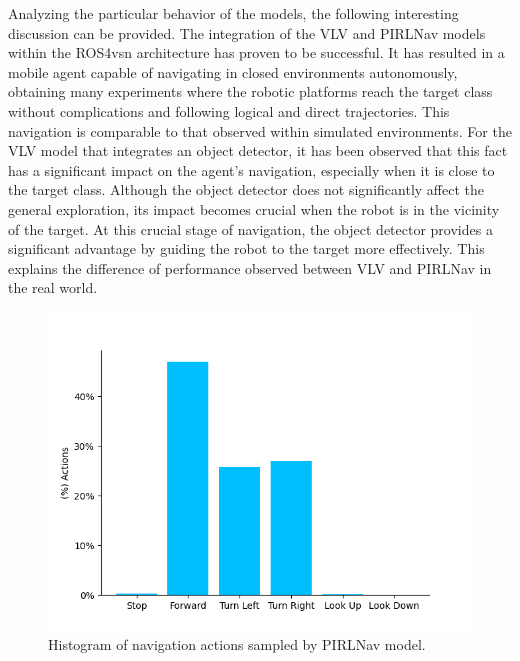 Analyzing the particular behavior of the models, the following interesting discussion can be provided.
The integration of the VLV and PIRLNav models within the ROS4\acrshort{vsn} architecture has proven to be successful.
It has resulted in a mobile agent capable of navigating in closed environments autonomously, obtaining many experiments where the robotic platforms reach the target class without complications and following logical and direct trajectories.
This navigation is comparable to that observed within simulated environments.
For the VLV model that integrates an object detector, it has been observed that this fact has a significant impact on the agent's navigation, especially when it is close to the target class.
Although the object detector does not significantly affect the general exploration, its impact becomes crucial when the robot is in the vicinity of the target.
At this crucial stage of navigation, the object detector provides a significant advantage by guiding the robot to the target more effectively.
This explains the difference of performance observed between VLV and PIRLNav in the real world.

\begin{figure}[t]
    \centering
        \includegraphics[width=\linewidth]{figures/ros4vsn/histograma_PIRLNav}
        \caption{Histogram of navigation actions sampled by PIRLNav model.}
        \label{fig:histrogram_pirlnav}
\end{figure}

